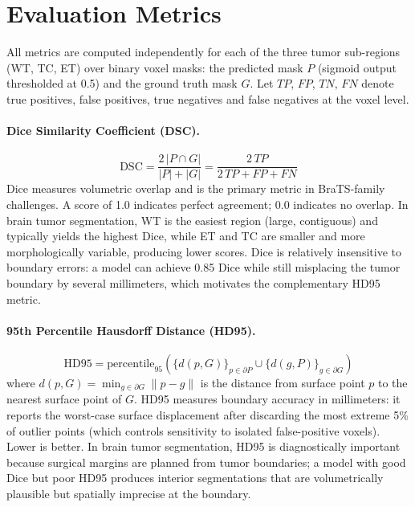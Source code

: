 \documentclass{article}
\begin{document}
\section{Evaluation Metrics}
\label{sec:metrics}

All metrics are computed independently for each of the three tumor sub-regions (WT, TC, ET) over binary voxel masks: the predicted mask $P$ (sigmoid output thresholded at 0.5) and the ground truth mask $G$. Let $TP$, $FP$, $TN$, $FN$ denote true positives, false positives, true negatives and false negatives at the voxel level.

\paragraph{Dice Similarity Coefficient (DSC).}
\begin{equation}
    \text{DSC} = \frac{2\,|P \cap G|}{|P| + |G|} = \frac{2\,TP}{2\,TP + FP + FN}
\end{equation}
Dice measures volumetric overlap and is the primary metric in BraTS-family challenges. A score of 1.0 indicates perfect agreement; 0.0 indicates no overlap. In brain tumor segmentation, WT is the easiest region (large, contiguous) and typically yields the highest Dice, while ET and TC are smaller and more morphologically variable, producing lower scores. Dice is relatively insensitive to boundary errors: a model can achieve 0.85 Dice while still misplacing the tumor boundary by several millimeters, which motivates the complementary HD95 metric.

\paragraph{95th Percentile Hausdorff Distance (HD95).}
\begin{equation}
    \text{HD95} = \text{percentile}_{95}\!\left(\{d(p, G)\}_{p \in \partial P} \cup \{d(g, P)\}_{g \in \partial G}\right)
\end{equation}
where $d(p, G) = \min_{g \in \partial G} \|p - g\|$ is the distance from surface point $p$ to the nearest surface point of $G$. HD95 measures boundary accuracy in millimeters: it reports the worst-case surface displacement after discarding the most extreme 5\% of outlier points (which controls sensitivity to isolated false-positive voxels). Lower is better. In brain tumor segmentation, HD95 is diagnostically important because surgical margins are planned from tumor boundaries; a model with good Dice but poor HD95 produces interior segmentations that are volumetrically plausible but spatially imprecise at the boundary.
\end{document}
